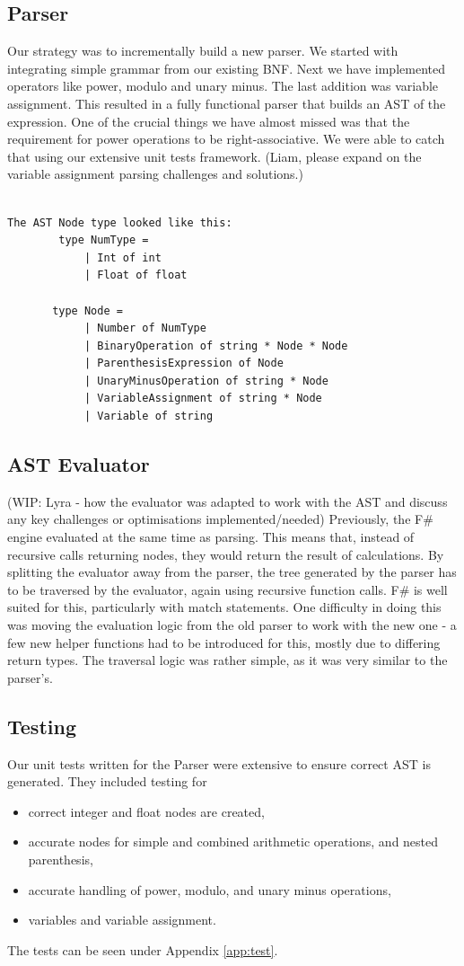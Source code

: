 \documentclass[a4paper, oneside, 11pt]{report}
\begin{document}
\subsection{Parser}
Our strategy was to incrementally build a new parser. We started with integrating simple grammar from our existing BNF. Next we have implemented operators like power, modulo and unary minus. The last addition was variable assignment. This resulted in a fully functional parser that builds an AST of the expression. One of the crucial things we have almost missed was that the requirement for power operations to be right-associative. We were able to catch that using our extensive unit tests framework.
(Liam, please expand on the variable assignment parsing challenges and solutions.)
\begin{verbatim}
    
The AST Node type looked like this:
        type NumType =
            | Int of int
            | Float of float

       type Node =
            | Number of NumType
            | BinaryOperation of string * Node * Node
            | ParenthesisExpression of Node
            | UnaryMinusOperation of string * Node
            | VariableAssignment of string * Node
            | Variable of string
\end{verbatim}
\subsection{AST Evaluator}
(WIP: Lyra - how the evaluator was adapted to work with the AST and discuss any key challenges or optimisations implemented/needed)
Previously, the F\# engine evaluated at the same time as parsing. This means that, instead of recursive calls returning nodes, they would return the result of calculations. By splitting the evaluator away from the parser, the tree generated by the parser has to be traversed by the evaluator, again using recursive function calls. F\# is well suited for this, particularly with match statements.
One difficulty in doing this was moving the evaluation logic from the old parser to work with the new one - a few new helper functions had to be introduced for this, mostly due to differing return types. The traversal logic was rather simple, as it was very similar to the parser's.

\subsection{Testing}
Our unit tests written for the Parser were extensive to ensure correct AST is generated. They included testing for
\begin{itemize}
    \item correct integer and float nodes are created, 
    \item accurate nodes for simple and combined arithmetic operations, and nested parenthesis,
    \item accurate handling of power, modulo, and unary minus operations, 
    \item variables and variable assignment. 
\end{itemize}
The tests can be seen under Appendix \ref{app:test}.
\end{document}
